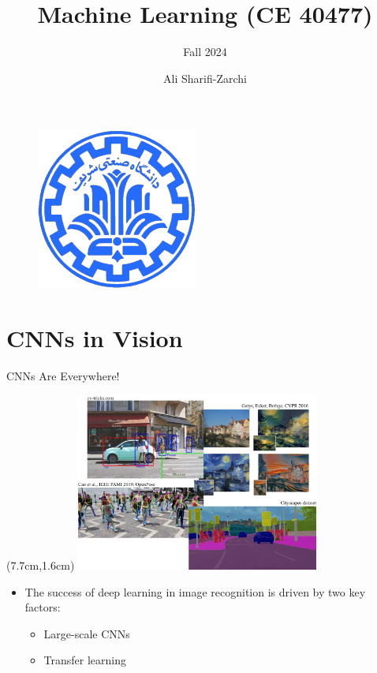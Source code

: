 \documentclass[serif, aspectratio=169]{beamer}
\author{Ali Sharifi-Zarchi}
\title{Machine Learning (CE 40477)}
\subtitle{Fall 2024}
\institute{
    CE Department \\
    Sharif University of Technology
}
\begin{document}
\begin{frame}
    \titlepage
    \vspace*{-0.6cm}
    \begin{figure}[htpb]
        \begin{center}
            \includegraphics[keepaspectratio, scale=0.25]{pic/sharif-main-logo}
        \end{center}
    \end{figure}
\end{frame}

\begin{frame}    
\tableofcontents[sectionstyle=show,
subsectionstyle=show/shaded/hide,
subsubsectionstyle=show/shaded/hide]
\end{frame}

\section{CNNs in Vision}

\begin{frame}{CNNs Are Everywhere!}

	\begin{textblock*}{5cm}(7.7cm,1.6cm) %
			\includegraphics[keepaspectratio, width=8cm]{pic/CNNs}
	\end{textblock*}
	
	\begin{itemize}
		\item The success of deep learning in \newline image recognition is driven by \newline two key factors:
		\begin{itemize}
			\item Large-scale CNNs
			\item Transfer learning
		\end{itemize}
	\end{itemize}
\end{frame}
\end{document}
